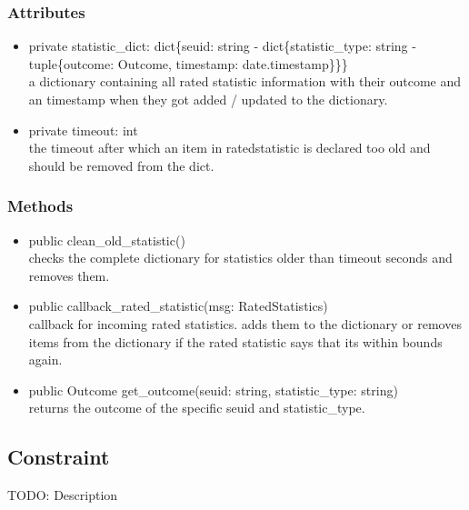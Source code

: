 \subsubsection{Attributes}
\begin{itemize}
	\item private statistic\_dict: dict\{seuid: string - dict\{statistic\_type: string - tuple\{outcome: Outcome, timestamp: date.timestamp\}\}\} \\
		a dictionary containing all rated statistic information with their outcome and an timestamp when they got added / updated to the dictionary.
	\item private timeout: int\\
		the timeout after which an item in ratedstatistic is declared too old and should be removed from the dict.
\end{itemize}
\subsubsection{Methods}
\begin{itemize}
	\item  public clean\_old\_statistic()\\
		checks the complete dictionary for statistics older than timeout seconds and removes them.
	\item public callback\_rated\_statistic(msg: RatedStatistics)\\
		callback for incoming rated statistics. adds them to the dictionary or removes items from the dictionary if the rated statistic says that its within bounds again. 
	\item public Outcome get\_outcome(seuid: string, statistic\_type: string)\\
		returns the outcome of the specific seuid and statistic\_type.
\end{itemize}

\subsection{Constraint }
TODO: Description


